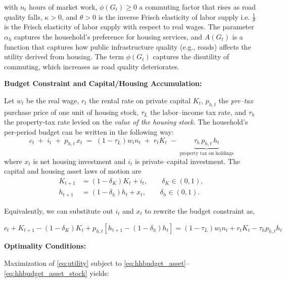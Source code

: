 with $n_t$ hours of market work, $\phi(G_t)\ge0$ a commuting factor that rises as road quality falls, $\kappa>0$, and $\theta>0$ is the inverse Frisch elasticity of labor supply i.e. $\frac{1}{\theta}$ is the Frisch elasticity of labor supply with respect to real wages. The parameter $\alpha_h$ captures the household’s preference for housing services, and $A(G_t)$ is a function that captures how public infrastructure quality (e.g., roads) affects the utility derived from housing. The term $\phi(G_t)$ captures the disutility of commuting, which increases as road quality deteriorates.

\vskip 0.3cm

{\bf Budget Constraint and Capital/Housing Accumulation:}
\vskip 0.3cm

Let $w_t$ be the real wage, $r_t$ the rental rate on private capital $K_t$, $p_{h,t}$ the \emph{pre–tax} purchase price of one unit of housing stock, $\tau_L$ the labor–income tax rate, and $\tau_h$ the property‐tax rate levied on the \emph{value of the housing stock}. The household’s per-period budget can be written in the following way:
\begin{equation}
c_t \;+\; i_t \;+\; p_{h,t}\,x_t \;=\; (1-\tau_L)w_t n_t \;+\; r_t K_t \;-\; \underbrace{\tau_h\,p_{h,t}\,h_t}_{\text{property tax on holdings}}
\label{eq:hhbudget_asset}
\end{equation}
where $x_t$ is net housing investment and $i_t$ is private–capital investment. The capital and housing asset laws of motion are
\begin{align}
K_{t+1}&=(1-\delta_K)K_t + i_t,\qquad \delta_K\in(0,1),\\
h_{t+1}&=(1-\delta_h)h_t + x_t,\qquad \delta_h\in(0,1).
\end{align}

Equivalently, we can substitute out $i_t$ and $x_t$ to rewrite the budget constraint as,

\begin{equation}
c_t + K_{t+1} - (1-\delta_K)K_t + p_{h,t}[h_{t+1} - (1-\delta_h)h_t] = (1-\tau_L)w_t n_t + r_t K_t - \tau_h p_{h,t}h_t
\label{eq:hhbudget_asset_stock}
\end{equation}

{\bf Optimality Conditions:}
\vskip 0.3cm

Maximization of \eqref{eq:utility} subject to \eqref{eq:hhbudget_asset}–\eqref{eq:hhbudget_asset_stock} yields:



